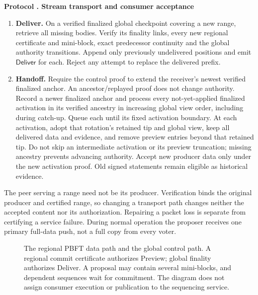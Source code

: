 \documentclass[11pt,a4paper,onecolumn]{article}
\newcommand{\RC}{\mathsf{RC}}
\newcommand{\Tag}[1]{\mathsf{#1}}
\newcommand{\Proc}[1]{\textnormal{\textsc{#1}}}
\theoremstyle{remark}\newtheorem{example}[definition]{Example}
\newcounter{protocol}
\newenvironment{protocol}[2]{\refstepcounter{protocol}\label{#1}\begin{mdframed}[nobreak=true,linewidth=.6pt,skipabove=10pt,skipbelow=10pt,innertopmargin=8pt,innerbottommargin=8pt]\small\raggedright\noindent\textbf{Protocol \theprotocol. #2}\par\smallskip}{\end{mdframed}}
\begin{document}
\begin{protocol}{alg:pull}{Stream transport and consumer acceptance}
\begin{enumerate}[label=\textbf{D\arabic*.}]
regional outcome chain with $\Proc{VerifyRC}$ on every $\RC$. Check that the
activation proof authorizes the receiver's current global view and its fixed
activation time has been reached. Append verified positions in order
to the preview suffix and emit $\Tag{Preview}$. Missing predecessors prevent
output. Stop extending an old global view after learning its finalized successor.
\item \textbf{Deliver.} On a verified finalized global checkpoint covering a
new range, retrieve all missing bodies. Verify its finality links, every new
regional certificate and mini-block, exact predecessor continuity and the global
authority transitions. Append only previously undelivered positions and emit
$\Tag{Deliver}$ for each. Reject any attempt to replace the delivered prefix.
\item \textbf{Handoff.} Require the control proof to extend the receiver's
newest verified finalized anchor. An ancestor/replayed proof does not change
authority. Record a newer finalized anchor and process every not-yet-applied
finalized activation in its verified ancestry in increasing global view order,
including during catch-up. Queue each until its fixed activation boundary.
At each activation, adopt that rotation's retained tip and global view, keep all
delivered data and evidence, and remove preview entries beyond that retained tip.
Do not skip an intermediate activation or its preview truncation; missing
ancestry prevents advancing authority. Accept new producer data only under
the new activation proof.
Old signed statements remain eligible as historical evidence.
\end{enumerate}
\end{protocol}

The peer serving a range need not be its producer. Verification binds the
original producer and certified range, so changing a transport path changes
neither the accepted content nor its authorization. Repairing a packet loss
is separate from certifying a service failure. During normal operation the
proposer receives one primary full-data push, not a full copy from every voter.

\begin{figure}[htbp]\centering

\caption{The regional PBFT data path and the global control path. A regional
commit certificate authorizes Preview; global finality authorizes Deliver.
A proposal may contain several mini-blocks, and dependent sequences wait for
commitment. The diagram does not assign consumer execution or publication to
the sequencing service.}
\label{fig:stream}
\end{figure}
\end{document}
